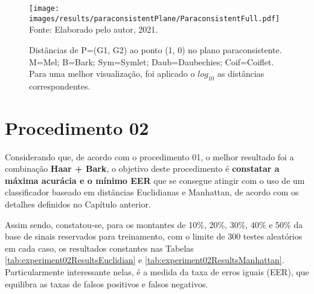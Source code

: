 	\newpage
	\begin{landscape}
		\begin{figure}[h]
			\centering
			\caption{Distâncias de P=(G1, G2) ao ponto (1, 0) no plano paraconsistente. M=Mel; B=Bark; Sym=Symlet; Daub=Daubechies; Coif=Coiflet. Para uma melhor visualização, foi aplicado o $log_{10}$ as distâncias correspondentes.}
			\texttt{[image: images/results/paraconsistentPlane/ParaconsistentFull.pdf]}
			\label{fig:paraconsistentfull}
			\\Fonte: Elaborado pelo autor, 2021.
		\end{figure}
	\end{landscape}
	\newpage
	
	\FloatBarrier
		
	\section{Procedimento 02} \label{chap:testsResults:sec:Experimento02}
	
		\par Considerando que, de acordo com o procedimento 01, o melhor resultado foi a combinação \textbf{Haar + Bark}, o objetivo deste procedimento é \textbf{constatar a máxima acurácia e o mínimo EER} que se consegue atingir com o uso de um classificador baseado em distâncias Euclidianas e Manhattan, de acordo com os detalhes definidos no Capítulo anterior.
		
		\par Assim sendo, constatou-se, para os montantes de 10\%, 20\%, 30\%, 40\% e 50\% da base de sinais reservados para treinamento, com o limite de 300 testes aleatórios em cada caso, os resultados constantes nas Tabelas \ref{tab:experiment02ResultsEuclidian} e \ref{tab:experiment02ResultsManhattan}. Particularmente interessante nelas, é a medida da taxa de erros iguais (EER), que equilibra as taxas de falsos positivos e falsos negativos. 
		
